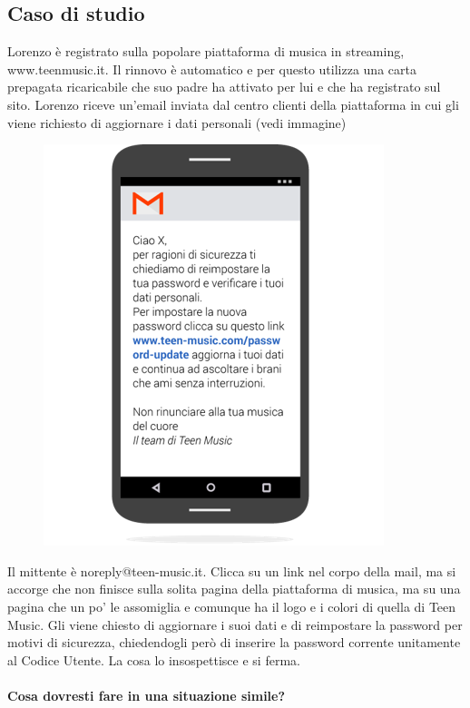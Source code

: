 \documentclass{article}
\begin{document}
\subsection{Caso di studio}
\label{sec:Caso10}
Lorenzo è registrato sulla popolare piattaforma di musica in streaming, www.teenmusic.it. Il rinnovo è automatico e per questo utilizza una carta prepagata ricaricabile che suo padre ha attivato per lui e che ha registrato sul sito. Lorenzo riceve un'email inviata dal centro clienti della piattaforma in cui gli viene richiesto di aggiornare i dati personali (vedi immagine)
\begin{figure}[h!]
	\centering
	\includegraphics[scale=0.5]{Caso10.png}
\end{figure}
Il mittente è noreply@teen-music.it. Clicca su un link nel corpo della mail, ma si accorge che non finisce sulla solita pagina della piattaforma di musica, ma su una pagina che un po' le assomiglia e comunque ha il logo e i colori di quella di Teen Music. Gli viene chiesto di aggiornare i suoi dati e di reimpostare la password per motivi di sicurezza, chiedendogli però di inserire la password corrente unitamente al Codice Utente. La cosa lo insospettisce e si ferma.
\\\vspace{5mm}\\
\textbf{Cosa dovresti fare in una situazione simile?}
\end{document}

